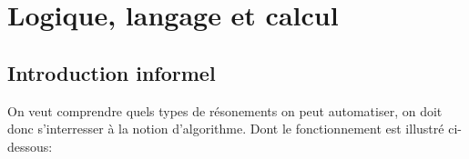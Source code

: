 \chapter{Logique, langage et calcul}


\section{Introduction informel}
On veut comprendre quels types de résonements on peut automatiser, 
on doit donc s'interresser à la notion d'algorithme. Dont le fonctionnement est illustré ci-dessous:

\begin{centering}




\begin{tikzpicture}[x=0.75pt,y=0.75pt,yscale=-1,xscale=1]


\end{tikzpicture}
\end{centering}

